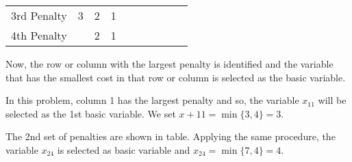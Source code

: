 \documentclass[../main-sheet.tex]{subfiles}
\begin{document}
\begin{table}[H]
\begin{tabular}{cccccccccccccc}
        3rd Penalty                                  & \multicolumn{2}{c}{3}                           & \multicolumn{2}{c}{2}                          & \multicolumn{2}{c}{1}                          & \multicolumn{2}{c}{}                           &                                                                        &                            &                    &                    &                    \\
        4th Penalty                                  & \multicolumn{2}{c}{}                            & \multicolumn{2}{c}{2}                          & \multicolumn{2}{c}{1}                          & \multicolumn{2}{c}{}                           &                                                                        &                            &                    &                    &                   
        \end{tabular}
    \end{table}
    Now, the row or column with the largest penalty is identified and the variable that has the smallest cost in that row or column is selected as the basic variable.

    In this problem, column 1 has the largest penalty and so, the variable \(x_{11}\) will be selected as the 1st basic variable. We set \(x+{11}=\min\{3,4\}=3\).

    The 2nd set of penalties are shown in table. Applying the same procedure, the variable \(x_{24}\) is selected as basic variable and \(x_{24}=\min\{7,4\}=4\).
\end{document}
